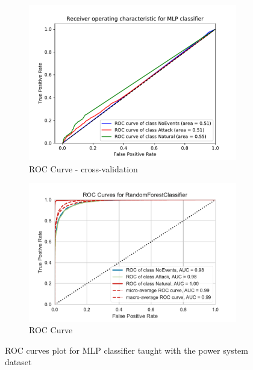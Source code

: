 \begin{figure}[t]
    \centering
    \begin{subfigure}[t]{130mm}
        \centering
        \includegraphics[page=1, width=\linewidth]{images/results_scikit/MLP}
        \caption{ROC Curve - cross-validation}
        \label{fig:scikit_MLP_ROC}
    \end{subfigure}
    \begin{subfigure}[t]{130mm}
        \centering
        \includegraphics[page=3, width=\linewidth]{images/roc_3c}
        \caption{ROC Curve}
        \label{fig:scikit_RF_ROC}
    \end{subfigure}
    \caption{ROC curves plot for MLP classifier taught with the power system dataset}
    \label{fig:ROCCM_MLP}
\end{figure}

